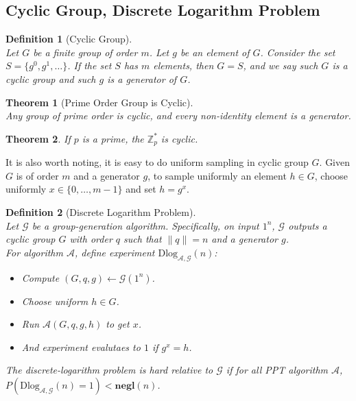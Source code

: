 \documentclass[12pt]{article}
\newtheorem{definition}{Definition}[section]
\newtheorem{theorem}{Theorem}[section]
\theoremstyle{definition}
\begin{document}
\subsection{Cyclic Group, Discrete Logarithm Problem}
\begin{definition}[Cyclic Group]
\hfill\\\normalfont Let $G$ be a finite group of order $m$. Let $g$ be an element of $G$. Consider the set $S=\{g^0, g^1,\ldots\}$. If the set $S$ has $m$ elements, then $G=S$, and we say such $G$ is a cyclic group and such $g$ is a generator of $G$.
\end{definition}
\begin{theorem}[Prime Order Group is Cyclic]
\hfill\\\normalfont Any group of prime order is cyclic, and every non-identity element is a generator.
\end{theorem}
\begin{theorem}\normalfont If $p$ is a prime, the $\mathbb{Z}_p^\ast$ is cyclic.\end{theorem}
It is also worth noting, it is easy to do uniform sampling in cyclic group $G$. Given $G$ is of order $m$ and a generator $g$, to sample uniformly an element $h\in G$, choose uniformly $x\in\{0,\ldots, m-1\}$ and set $h=g^x$.
\begin{definition}[Discrete Logarithm Problem]
\hfill\\\normalfont Let $\mathcal{G}$ be a group-generation algorithm. Specifically, on input $1^n$, $\mathcal{G}$ outputs a cyclic group $G$ with order $q$ such that $\|q\|=n$ and a generator $g$.\\
For algorithm $\mathcal{A}$, define experiment $\text{Dlog}_{\mathcal{A}, \mathcal{G}}(n)$:
\begin{itemize}
  \item Compute $(G,q,g)\leftarrow \mathcal{G}(1^n)$.
  \item Choose uniform $h\in G$.
  \item Run $\mathcal{A}(G,q,g,h)$ to get $x$.
  \item And experiment evalutaes to $1$ if $g^x=h$.
\end{itemize}
The discrete-logarithm problem is hard relative to $\mathcal{G}$ if for all PPT algorithm $\mathcal{A}$, $P(\text{Dlog}_{\mathcal{A},\mathcal{G}}(n)=1)<\mathbf{negl}(n)$.
\end{definition}
\end{document}
